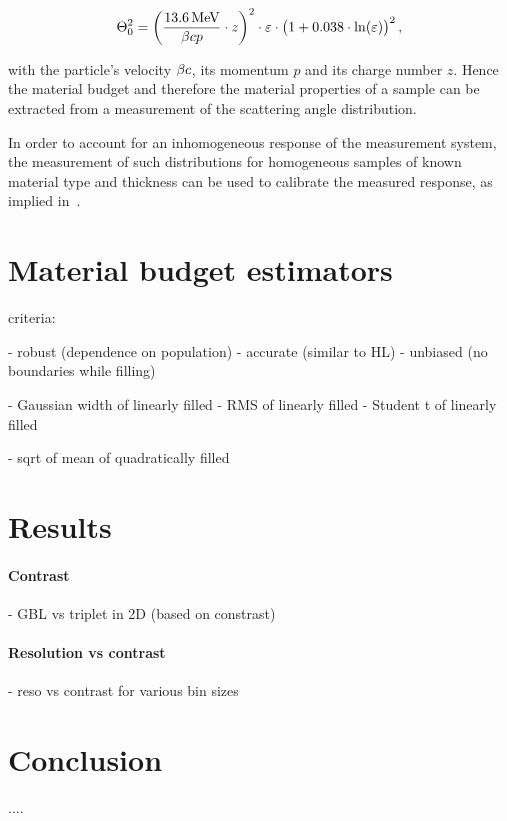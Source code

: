 \documentclass{PoS}
\newcommand{\eV}{\ensuremath{\textrm{eV}}}
\newcommand{\cspeed}{\ensuremath{\mathnormal{c}}}
\begin{document}
\begin{equation}
 \Theta_0^2 = \left( \frac{\SI{13.6}{\mega\eV}}{\beta \cspeed p}\cdot z \right)^2 \cdot \varepsilon \cdot \big( 1+0.038\cdot\ln(\varepsilon) \big)^2\,,
 \label{eq:highland}
\end{equation}

\noindent
with the particle's velocity $\beta \cspeed$, its momentum $p$ and its charge number $z$. 
Hence the material budget and therefore the material properties of a sample can be extracted from a measurement of the scattering angle distribution.

In order to account for an inhomogeneous response of the measurement system,
 the measurement of such distributions for homogeneous samples of known material type and thickness can be used to calibrate the measured response, as implied in~\cite{ref:X0}.

\section{Material budget estimators}

criteria:

- robust (dependence on population)
- accurate (similar to HL)
- unbiased (no boundaries while filling)

- Gaussian width of linearly filled
- RMS of linearly filled 
- Student t of linearly filled

- sqrt of mean of quadratically filled



\section{Results}
\paragraph{Contrast}

- GBL vs triplet in 2D (based on constrast)

\paragraph{Resolution vs contrast}

- reso vs contrast for various bin sizes


\section{Conclusion}




\begin{thebibliography}{99}
....

\end{thebibliography}
\end{document}
